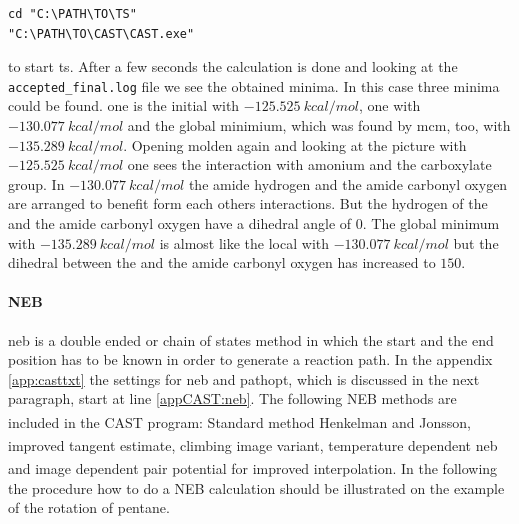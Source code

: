 \documentclass[a4paper,11pt]{scrartcl}
\newcommand{\myCite}[1]{\textsuperscript{\cite{#1}}}
\begin{document}
\begin{lstlisting}[frame=single,]
cd "C:\PATH\TO\TS"
"C:\PATH\TO\CAST\CAST.exe"
\end{lstlisting}

to start \ac{ts}. After a few seconds the calculation is done and looking at the \texttt{accepted\_final.log} file we see the obtained minima. In this case three minima could be found. one is the initial with $-125.525~kcal/mol$, one with $-130.077~kcal/mol$ and the global minimium, which was found by \ac{mcm}, too, with $-135.289~kcal/mol$. Opening molden again and looking at the picture with $-125.525~kcal/mol$ one sees the interaction with amonium and the carboxylate group. In $-130.077~kcal/mol$ the amide hydrogen and the amide carbonyl oxygen are arranged to benefit form each others interactions. But the hydrogen of the  and the amide carbonyl oxygen have a dihedral angle of $0$\textdegree. The global minimum with $-135.289~kcal/mol$ is almost like the local with $-130.077~kcal/mol$ but the dihedral between the  and the amide carbonyl oxygen has increased to $150$\textdegree.



\paragraph{NEB}\ac{neb} is a double ended or chain of states method in which the start and the end position has to be known in order to generate a reaction path. In the appendix \ref{app:casttxt} the settings for \ac{neb} and pathopt, which is discussed in the next paragraph, start at line \ref{appCAST:neb}.
The following NEB methods are included in the CAST program: Standard method Henkelman and Jonsson\myCite{JonssonH.1998}, improved tangent estimate\myCite{Henkelman2000}, climbing image variant\myCite{Henkelman2000a}, temperature dependent neb\myCite{Crehuet2003} and image dependent pair potential for improved interpolation\myCite{Smidstrup2014}.
In the following the procedure how to do a NEB calculation should be illustrated on the example of the rotation of pentane.\newline
\end{document}
